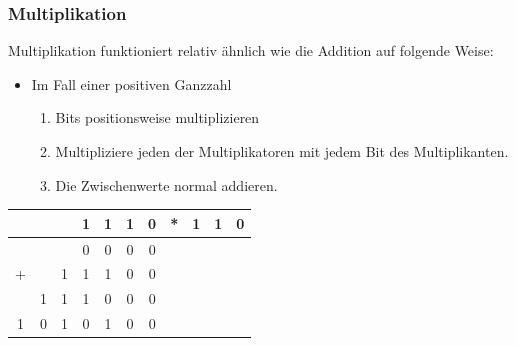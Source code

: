 \documentclass{article}
\begin{document}
		\subsubsection{Multiplikation}
			Multiplikation funktioniert relativ ähnlich wie die Addition auf folgende Weise:
			\begin{itemize}
				\item{Im Fall einer positiven Ganzzahl}
				\begin{enumerate}
					\item{Bits positionsweise multiplizieren}
					\item{Multipliziere jeden der Multiplikatoren mit jedem Bit des Multiplikanten.}
					\item{Die Zwischenwerte normal addieren.}
				\end{enumerate}
			\vspace{5pt}
			\end{itemize}
			\begin{tabular}{ccccccccccc}
				&&&1&1&1&0&*&1&1&0 \\ \midrule
				&&&0&0&0&0&&&& \\
				+&&1&1&1&0&0&&&& \\
				&1&1&1&0&0&0&&&& \\ \midrule
				1&0&1&0&1&0&0&&&&
			\end{tabular}
\end{document}
